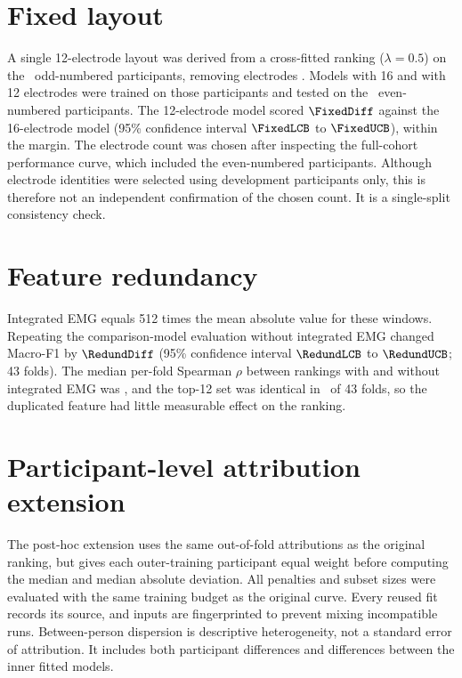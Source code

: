 \documentclass{iopjournal}
\begin{document}
\section{Fixed layout}
\label{app:fixed}
A single 12-electrode layout was derived from a cross-fitted ranking ($\lambda = 0.5$) on the \FixedDev\ odd-numbered participants, removing electrodes \FixedDropped. Models with 16 and with 12 electrodes were trained on those participants and tested on the \FixedTest\ even-numbered participants. The 12-electrode model scored $\FixedDiff$ against the 16-electrode model (95\% confidence interval $\FixedLCB$ to $\FixedUCB$), within the margin. The electrode count was chosen after inspecting the full-cohort performance curve, which included the even-numbered participants. Although electrode identities were selected using development participants only, this is therefore not an independent confirmation of the chosen count. It is a single-split consistency check.

\section{Feature redundancy}
\label{app:redund}
Integrated EMG equals 512 times the mean absolute value for these windows. Repeating the comparison-model evaluation without integrated EMG changed Macro-F1 by $\RedundDiff$ (95\% confidence interval $\RedundLCB$ to $\RedundUCB$; 43 folds). The median per-fold Spearman $\rho$ between rankings with and without integrated EMG was \RedundRho, and the top-12 set was identical in \RedundTopTwelveSame\ of 43 folds, so the duplicated feature had little measurable effect on the ranking.

\section{Participant-level attribution extension}
\label{app:participant_extension}
The post-hoc extension uses the same out-of-fold attributions as the original ranking, but gives each outer-training participant equal weight before computing the median and median absolute deviation. All penalties and subset sizes were evaluated with the same training budget as the original curve. Every reused fit records its source, and inputs are fingerprinted to prevent mixing incompatible runs. Between-person dispersion is descriptive heterogeneity, not a standard error of attribution. It includes both participant differences and differences between the inner fitted models.
\end{document}
